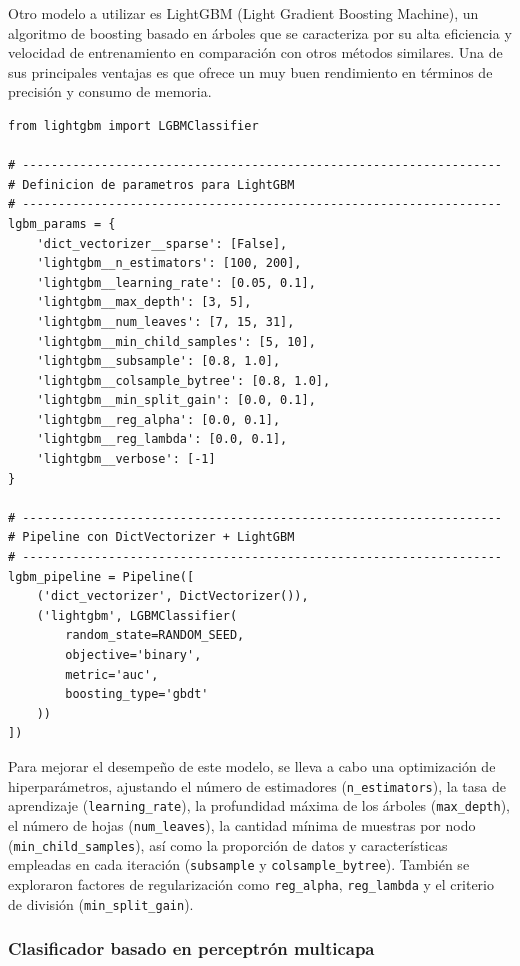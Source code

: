 \documentclass[11pt,a4paper,spanish]{book}
\numberwithin{equation}{chapter}
\numberwithin{figure}{chapter}
\begin{document}
Otro modelo a utilizar es LightGBM (Light Gradient Boosting Machine), un algoritmo de 
boosting basado en árboles que se caracteriza por su alta eficiencia y velocidad de 
entrenamiento en comparación con otros métodos similares. Una de sus principales ventajas 
es que ofrece un muy buen rendimiento en términos de precisión y consumo de memoria. 


\vspace{5mm}
\begin{lstlisting}
from lightgbm import LGBMClassifier

# -------------------------------------------------------------------
# Definicion de parametros para LightGBM
# -------------------------------------------------------------------
lgbm_params = {
    'dict_vectorizer__sparse': [False],
    'lightgbm__n_estimators': [100, 200],
    'lightgbm__learning_rate': [0.05, 0.1],  
    'lightgbm__max_depth': [3, 5],  
    'lightgbm__num_leaves': [7, 15, 31],  
    'lightgbm__min_child_samples': [5, 10],  
    'lightgbm__subsample': [0.8, 1.0],
    'lightgbm__colsample_bytree': [0.8, 1.0],
    'lightgbm__min_split_gain': [0.0, 0.1],  
    'lightgbm__reg_alpha': [0.0, 0.1],  
    'lightgbm__reg_lambda': [0.0, 0.1],  
    'lightgbm__verbose': [-1]  
}

# -------------------------------------------------------------------
# Pipeline con DictVectorizer + LightGBM
# -------------------------------------------------------------------
lgbm_pipeline = Pipeline([
    ('dict_vectorizer', DictVectorizer()),
    ('lightgbm', LGBMClassifier(
        random_state=RANDOM_SEED,
        objective='binary',
        metric='auc',
        boosting_type='gbdt'
    ))
])
\end{lstlisting}

Para mejorar el desempeño de este modelo, se lleva a cabo una optimización de 
hiperparámetros, ajustando el número de estimadores (\lstinline|n_estimators|), la tasa 
de aprendizaje (\lstinline|learning_rate|), la profundidad máxima de los árboles 
(\lstinline|max_depth|), el número de hojas (\lstinline|num_leaves|), la cantidad mínima 
de muestras por nodo (\lstinline|min_child_samples|), así como la proporción de datos y 
características empleadas en cada iteración (\lstinline|subsample| y 
\lstinline|colsample_bytree|). También se exploraron factores de regularización como 
\lstinline|reg_alpha|, \lstinline|reg_lambda| y el criterio de división 
(\lstinline|min_split_gain|). 



\subsubsection{Clasificador basado en perceptrón multicapa}
\end{document}
